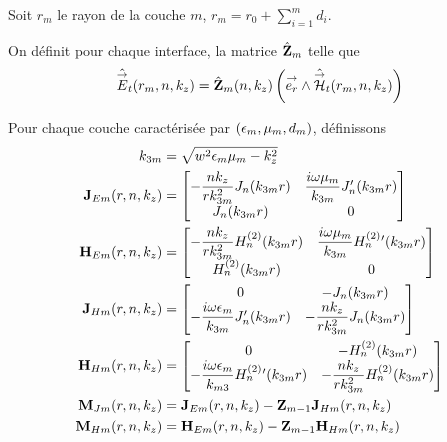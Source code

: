     Soit \(r_m\) le rayon de la couche \(m\), \(r_m = r_0 +\sum_{i=1}^{m} d_{i}\).

    \begin{defn}
      On définit pour chaque interface, la matrice \(\hat {\mathbf{Z}}_m\) telle que
      \begin{equation}
        \hat {{\overset{\rightarrow}{E}}}_t(r_m,n,k_z) = \hat {\mathbf{Z}}_m(n,k_z) \left({\overset{\rightarrow}{e_r}} \wedge \hat {{\overset{\rightarrow}{\mathcal{H}}}}_t(r_m,n,k_z)\right)
      \end{equation}
    \end{defn}

    Pour chaque couche caractérisée par \((\epsilon_m,\mu_m,d_m)\), définissons
    \begin{subequations}
      \begin{align}
        k_{3m} &= \sqrt{w^2\epsilon_m\mu_m - k_z^2}
        \\
        \mathbf{J}_{Em}(r,n,k_z) &=
          \begin{bmatrix}
            -\dfrac{nk_z}{rk_{3m}^2}J_n(k_{3m}r) & \dfrac{i\omega\mu_m}{k_{3m}}J_n'(k_{3m}r)
            \\
            J_n(k_{3m}r) & 0
          \end{bmatrix}
        \\
        \mathbf{H}_{Em}(r,n,k_z) &=
          \begin{bmatrix}
            -\dfrac{nk_z}{rk_{3m}^2}H_n^{(2)}(k_{3m}r) & \dfrac{i\omega\mu_m}{k_{3m}}H_n^{(2)}{}'(k_{3m}r)
            \\
            H_n^{(2)}(k_{3m}r) & 0
          \end{bmatrix}
        \\
        \mathbf{J}_{Hm}(r,n,k_z) &=
          \begin{bmatrix}
            0 & -J_n(k_{3m}r)
            \\
            -\dfrac{i\omega\epsilon_m}{k_{3m}}J_n'(k_{3m}r) & -\dfrac{nk_z}{rk_{3m}^2}J_n(k_{3m}r)
          \end{bmatrix}
        \\
        \mathbf{H}_{Hm}(r,n,k_z) &=
          \begin{bmatrix}
            0 & -H_n^{(2)}(k_{3m}r)
            \\
            -\dfrac{i\omega\epsilon_m}{k_{m3}}H_n^{(2)}{}'(k_{3m}r) & -\dfrac{nk_z}{rk_{3m}^2}H_n^{(2)}(k_{3m}r)
          \end{bmatrix}
        \\
        \mathbf{M}_{Jm}(r,n,k_z) &= \mathbf{J}_{Em}(r,n,k_z) -  \mathbf{Z}_{m-1} \mathbf{J}_{Hm}(r,n,k_z)
        \\
        \mathbf{M}_{Hm}(r,n,k_z) &= \mathbf{H}_{Em}(r,n,k_z) -  \mathbf{Z}_{m-1} \mathbf{H}_{Hm}(r,n,k_z)
      \end{align}
    \end{subequations}

